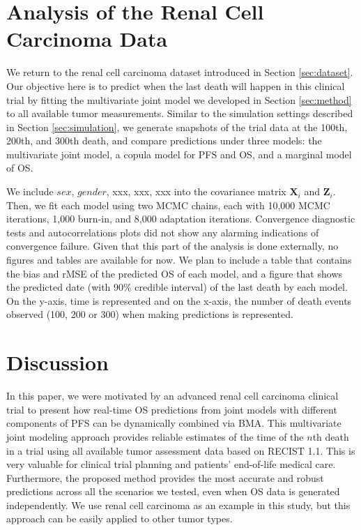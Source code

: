 \section{Analysis of the Renal Cell Carcinoma Data}
\label{sec:caseanalysis}
We return to the renal cell carcinoma dataset introduced in Section \ref{sec:dataset}. Our objective here is to predict when the last death will happen in this clinical trial by fitting the multivariate joint model we developed in Section \ref{sec:method} to all available tumor measurements. Similar to the simulation settings described in Section \ref{sec:simulation}, we generate snapshots of the trial data at the 100th, 200th, and 300th death, and compare predictions under three models: the multivariate joint model, a copula model for \ac{PFS} and \ac{OS}, and a marginal model of \ac{OS}. 

We include $sex$, $gender$, xxx, xxx, xxx into the covariance matrix $\textbf{X}_i$ and $\textbf{Z}_i$. Then, we fit each model using two MCMC chains, each with 10,000 MCMC iterations, 1,000 burn-in, and 8,000 adaptation iterations. Convergence diagnostic tests and autocorrelations plots did not show any alarming indications of convergence failure. Given that this part of the analysis is done externally, no figures and tables are available for now. We plan to include a table that contains the bias and rMSE of the predicted OS of each model, and a figure that shows the predicted date (with 90\% credible interval) of the last death by each model. On the y-axis, time is represented and on the x-axis, the number of death events observed (100, 200 or 300) when making predictions is represented.

\section{Discussion}
\label{sec:discussion}
In this paper, we were motivated by an advanced renal cell carcinoma clinical trial to present how real-time \ac{OS} predictions from joint models with different components of \ac{PFS} can be dynamically combined via \ac{BMA}. This multivariate joint modeling approach provides reliable estimates of the time of the $n$th death in a trial using all available tumor assessment data based on \acs{RECIST} 1.1. This is very valuable for clinical trial planning and patients' end-of-life medical care. Furthermore, the proposed method provides the most accurate and robust predictions across all the scenarios we tested, even when \ac{OS} data is generated independently. We use renal cell carcinoma as an example in this study, but this approach can be easily applied to other tumor types.

